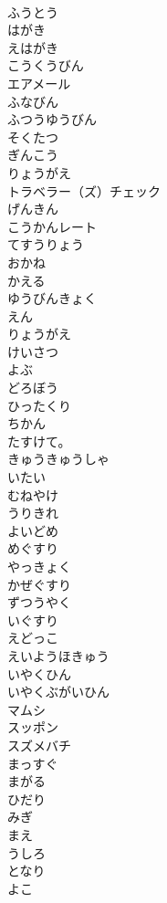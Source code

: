 \documentclass[8pt]{extreport}
\begin{document}
\begin{CJK}{UTF8}{min}
\\	ふうとう
\\	はがき
\\	えはがき
\\	こうくうびん
\\	エアメール
\\	ふなびん
\\	ふつうゆうびん
\\	そくたつ
\\	ぎんこう
\\	りょうがえ
\\	トラベラー（ズ）チェック
\\	げんきん
\\	こうかんレート
\\	てすうりょう
\\	おかね
\\	かえる
\\	ゆうびんきょく
\\	えん
\\	りょうがえ
\\	けいさつ
\\	よぶ
\\	どろぼう
\\	ひったくり
\\	ちかん
\\	たすけて。
\\	きゅうきゅうしゃ
\\	いたい
\\	むねやけ
\\	うりきれ
\\	よいどめ
\\	めぐすり
\\	やっきょく
\\	かぜぐすり
\\	ずつうやく
\\	いぐすり
\\	えどっこ
\\	えいようほきゅう
\\	いやくひん
\\	いやくぶがいひん
\\	マムシ
\\	スッポン
\\	スズメバチ
\\	まっすぐ
\\	まがる
\\	ひだり
\\	みぎ
\\	まえ
\\	うしろ
\\	となり
\\	よこ

\end{CJK}
\end{document}
